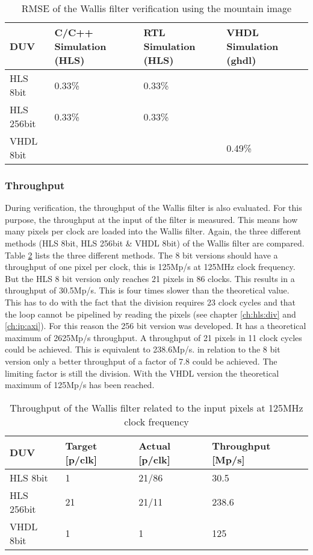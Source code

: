 \begin{table}[tb!]
    \centering
    \begin{tabular}{l l l l}
        \toprule
        DUV & C/C++ Simulation (HLS) & RTL Simulation (HLS) & VHDL Simulation (ghdl) \\
        \midrule
        HLS  8bit    & 0.33\%    & 0.33\%    & {} \\
        HLS  256bit  & 0.33\%    & 0.33\%    & {} \\
        VHDL 8bit        & {}         & {}         & 0.49\% \\
        \bottomrule
    \end{tabular}
    \caption{RMSE of the Wallis filter verification using the mountain image}
    \label{tab:rmse_mountain}
\end{table}

\subsubsection*{Throughput}
During verification, the throughput of the Wallis filter is also evaluated.
For this purpose, the throughput at the input of the filter is measured. This
means how many pixels per clock are loaded into the Wallis filter. Again, the
three different methods (HLS 8bit, HLS 256bit \& VHDL 8bit) of the Wallis filter
are compared. Table \ref{tab:throughput} lists the three different methods. The
8 bit versions should have a throughput of one pixel per clock, this is 125Mp/s
at 125MHz clock frequency. But the HLS 8 bit version only reaches 21 pixels in
86 clocks. This results in a throughput of 30.5Mp/s. This is four times slower
than the theoretical value. This has to do with the fact that the division
requires 23 clock cycles and that the loop cannot be pipelined by reading the
pixels (see chapter \ref{ch:hls:div} and \ref{ch:ip:axi}). For this reason the
256 bit version was developed. It has a theoretical maximum of 2625Mp/s
throughput. A throughput of 21 pixels in 11 clock cycles could be achieved. This
is equivalent to 238.6Mp/s. in relation to the 8 bit version only a better
throughput of a factor of 7.8 could be achieved. The limiting factor is still
the division. With the VHDL version the theoretical maximum of 125Mp/s has been
reached.

\begin{table}[tb!]
    \centering
    \begin{tabular}{l l l l}
        \toprule
        DUV & Target [p/clk] & Actual [p/clk]  & Throughput [Mp/s]\\
        \midrule
        HLS  8bit    & 1     & 21/86     & 30.5\\
        HLS  256bit  & 21    & 21/11     & 238.6 \\
        VHDL 8bit        & 1     & 1         & 125 \\
        \bottomrule
    \end{tabular}
    \caption{Throughput of the Wallis filter related to the input pixels at
    125MHz clock frequency}
    \label{tab:throughput}
\end{table}


